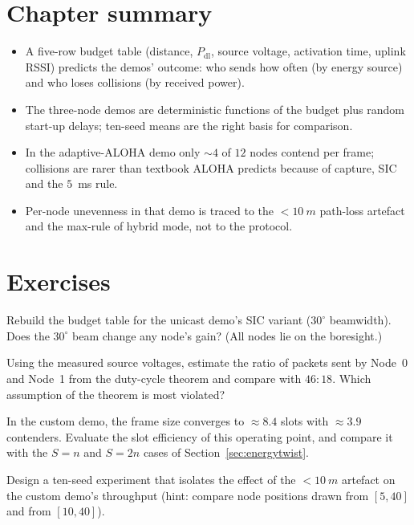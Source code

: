 \section{Chapter summary}
\begin{itemize}
 \item A five-row budget table (distance, $P_{\mathrm{dl}}$, source voltage, activation time, uplink RSSI) predicts the demos' outcome: who sends how often (by energy source) and who loses collisions (by received power).
 \item The three-node demos are deterministic functions of the budget plus random start-up delays; ten-seed means are the right basis for comparison.
 \item In the adaptive-ALOHA demo only $\sim4$ of $12$ nodes contend per frame; collisions are rarer than textbook ALOHA predicts because of capture, SIC and the $5$~ms rule.
 \item Per-node unevenness in that demo is traced to the $<\SI{10}{m}$ path-loss artefact and the max-rule of hybrid mode, not to the protocol.
\end{itemize}

\section*{Exercises}
\begin{exercise}
Rebuild the budget table for the unicast demo's SIC variant ($30^\circ$ beamwidth). Does the $30^\circ$ beam change any node's gain? (All nodes lie on the boresight.)
\end{exercise}
\begin{exercise}
Using the measured source voltages, estimate the ratio of packets sent by Node~0 and Node~1 from the duty-cycle theorem and compare with $46:18$. Which assumption of the theorem is most violated?
\end{exercise}
\begin{exercise}
In the custom demo, the frame size converges to $\approx8.4$ slots with $\approx3.9$ contenders. Evaluate the slot efficiency of this operating point, and compare it with the $S=n$ and $S=2n$ cases of Section~\ref{sec:energytwist}.
\end{exercise}
\begin{exercise}
Design a ten-seed experiment that isolates the effect of the $<\SI{10}{m}$ artefact on the custom demo's throughput (hint: compare node positions drawn from $[5,40]$ and from $[10,40]$).
\end{exercise}
